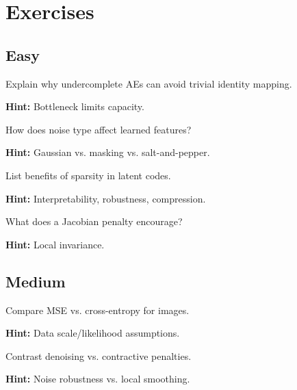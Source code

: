 
\section*{Exercises}

\subsection*{Easy}

\begin{problem}[Undercomplete AE]
Explain why undercomplete AEs can avoid trivial identity mapping.

\textbf{Hint:} Bottleneck limits capacity.
\end{problem}

\begin{problem}
How does noise type affect learned features?

\textbf{Hint:} Gaussian vs. masking vs. salt-and-pepper.
\end{problem}

\begin{problem}
List benefits of sparsity in latent codes.

\textbf{Hint:} Interpretability, robustness, compression.
\end{problem}

\begin{problem}
What does a Jacobian penalty encourage?

\textbf{Hint:} Local invariance.
\end{problem}

\subsection*{Medium}

\begin{problem}
Compare MSE vs. cross-entropy for images.

\textbf{Hint:} Data scale/likelihood assumptions.
\end{problem}

\begin{problem}
Contrast denoising vs. contractive penalties.

\textbf{Hint:} Noise robustness vs. local smoothing.
\end{problem}

